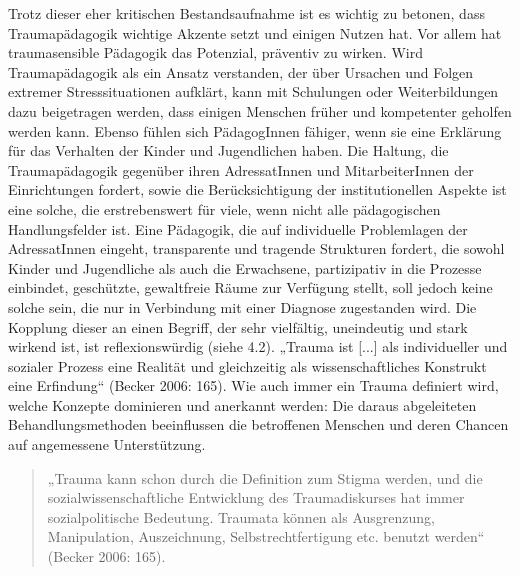 Trotz dieser eher kritischen Bestandsaufnahme ist es wichtig zu betonen, dass Traumapädagogik wichtige Akzente setzt und einigen Nutzen hat. Vor allem hat traumasensible Pädagogik das Potenzial, präventiv zu wirken. Wird Traumapädagogik als ein Ansatz verstanden, der über Ursachen und Folgen extremer Stresssituationen aufklärt, kann mit Schulungen oder Weiterbildungen dazu beigetragen werden, dass einigen Menschen früher und kompetenter geholfen werden kann. Ebenso fühlen sich PädagogInnen fähiger, wenn sie eine Erklärung für das Verhalten der Kinder und Jugendlichen haben. Die Haltung, die Traumap{\"a}dagogik gegenüber ihren AdressatInnen und MitarbeiterInnen der Einrichtungen fordert, sowie die Berücksichtigung der institutionellen Aspekte ist eine solche, die erstrebenswert für viele, wenn nicht alle pädagogischen Handlungsfelder ist. Eine Pädagogik, die auf individuelle Problemlagen der AdressatInnen eingeht, transparente und tragende Strukturen fordert, die sowohl Kinder und Jugendliche als auch die Erwachsene, partizipativ in die Prozesse einbindet, geschützte, gewaltfreie Räume zur Verfügung stellt, soll jedoch keine solche sein, die nur in Verbindung mit einer Diagnose zugestanden wird. Die Kopplung dieser an einen Begriff, der sehr vielfältig, uneindeutig und stark wirkend ist, ist reflexionswürdig (siehe 4.2). „Trauma ist [...] als individueller und sozialer Prozess eine Realität und gleichzeitig als wissenschaftliches Konstrukt eine Erfindung“ (Becker 2006: 165). Wie auch immer ein Trauma definiert wird, welche Konzepte dominieren und anerkannt werden: Die daraus abgeleiteten Behandlungsmethoden beeinflussen die betroffenen Menschen und deren Chancen auf angemessene Unterstützung.

\begin{quote}
\small{„Trauma kann schon durch die Definition zum Stigma werden, und die sozialwissenschaftliche Entwicklung des Traumadiskurses hat immer sozialpolitische Bedeutung. Traumata können als Ausgrenzung, Manipulation, Auszeichnung, Selbstrechtfertigung etc. benutzt werden“ (Becker 2006: 165).}
\end{quote}

